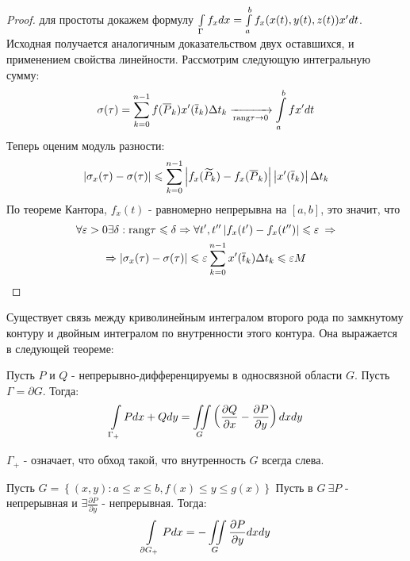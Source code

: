 \begin{proof}
	для простоты докажем формулу
	$\int\limits_{\Gamma} f_xdx = \int\limits_{a}^{b}f_x(x(t), y(t), z(t))x' dt$. 
	Исходная получается аналогичным доказательством двух оставшихся, и применением свойства линейности. 
	Рассмотрим следующую интегральную сумму:
	\begin{gather*}
		\sigma(\tau) = \sum\limits_{k = 0}^{n - 1} f(\overline{P}_k)x'(\overline{t}_k)\Delta t_k
		\xrightarrow[\text{rang}\tau \rightarrow 0]{} \int\limits_{a}^{b} f x' dt
	\end{gather*}
	Теперь оценим модуль разности: 
	\begin{gather*}
		\left|\sigma_x(\tau) - \sigma(\tau)\right| \leqslant 
		\sum\limits_{k = 0}^{n - 1} \left|f_x(\widetilde{P}_k) - f_x(\overline{P}_k)\right|
		\left|x'(\overline{t}_k)\right| \Delta t_k
	\end{gather*}
	По теореме Кантора, $f_x(t)$ - равномерно непрерывна на $[a, b]$, это значит, что
	\begin{gather*}
		\forall\varepsilon > 0 \exists \delta : \text{rang}\tau \leqslant \delta \Rightarrow 
		\forall t', t'' \left|f_x(t') - f_x(t'')\right| \leqslant \varepsilon  \: \Rightarrow\\
		\Rightarrow \left|\sigma_x(\tau) - \sigma(\tau)\right| \leqslant 
		\varepsilon \sum\limits_{k = 0}^{n - 1} x'(\overline{t}_k) \Delta t_k \leqslant \varepsilon M
	\end{gather*}
\end{proof}

Существует связь между криволинейным интегралом второго рода по замкнутому контуру и 
двойным интегралом по внутренности этого контура. Она выражается в следующей теореме:

\begin{theorem}
	Пусть $P$ и $Q$ - непрерывно-дифференцируемы в односвязной области $G$. Пусть $\Gamma = \partial G$.
	Тогда:
	\begin{gather*}
		\int\limits_{\Gamma_{+}} Pdx + Qdy = 
		\iint\limits_{G} \left( \frac{\partial Q}{\partial x} - \frac{\partial P}{\partial y} \right) dxdy
	\end{gather*}
\end{theorem}

$\Gamma_{+}$ - означает, что обход такой, что внутренность $G$ всегда слева.

\newpage

\begin{lemma}
	Пусть $G = \left\{(x, y) : a\leqslant x \leqslant b, f(x) \leqslant y \leqslant g(x)  \right\} $
	Пусть в $G \: \exists P$ - непрерывная и $\exists \frac{\partial P}{\partial y}$ - непрерывная.
	Тогда:
	\begin{gather*}
		\int\limits_{\partial G_{+}} Pdx = -\iint\limits_{G} \frac{\partial P}{\partial y} dxdy 
	\end{gather*}
\end{lemma}


